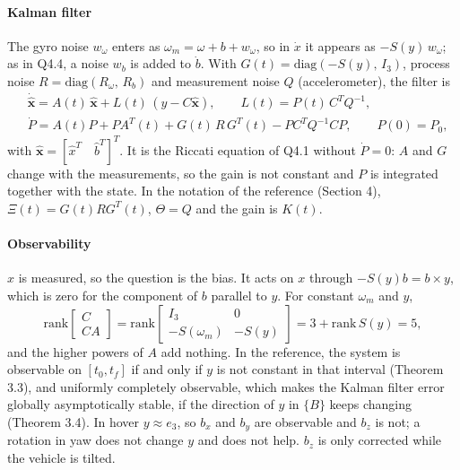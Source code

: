 \documentclass[10pt,a4paper]{article}
\newenvironment{answer}{%
  \begin{tcolorbox}[breakable,enhanced,colback=white,colframe=greyline,
    boxrule=0.6pt,arc=2pt,left=8pt,right=8pt,top=7pt,bottom=7pt,
    before skip=0pt,after skip=12pt]
}{\end{tcolorbox}}
\newcommand{\fB}{\{B\}}
\begin{document}
\begin{answer}
\paragraph{Kalman filter}
The gyro noise $w_\omega$ enters as $\omega_m = \omega + b + w_\omega$,
so in $\dot x$ it appears as $-S(y)\,w_\omega$; as in Q4.4, a noise
$w_b$ is added to $\dot b$. With $G(t) = \mathrm{diag}(-S(y),\, I_3)$,
process noise $R = \mathrm{diag}(R_\omega,\, R_b)$ and measurement noise
$Q$ (accelerometer), the filter is
\[
\begin{aligned}
  &\dot{\hat{\mathbf{x}}} = A(t)\,\hat{\mathbf{x}} + L(t)\,(y - C\hat{\mathbf{x}}),
  \qquad L(t) = P(t)\,C^TQ^{-1},\\
  &\dot P = A(t)P + PA^T(t) + G(t)\,R\,G^T(t) - PC^TQ^{-1}CP, \qquad P(0)=P_0 ,
\end{aligned}
\]
with $\hat{\mathbf{x}} = [\hat x^T \quad \hat b^T]^T$. It is the
Riccati equation of Q4.1 without $\dot P = 0$: $A$ and $G$ change with
the measurements, so the gain is not constant and $P$ is integrated
together with the state. In the notation of the reference (Section 4),
$\Xi(t) = G(t)RG^T(t)$, $\Theta = Q$ and the gain is $K(t)$.

\paragraph{Observability}
$x$ is measured, so the question is the bias. It acts on $x$ through
$-S(y)b = b\times y$, which is zero for the component of $b$ parallel to
$y$. For constant $\omega_m$ and $y$,
\[
  \mathrm{rank}\begin{bmatrix} C\\ CA \end{bmatrix}
  = \mathrm{rank}\begin{bmatrix} I_3 & 0\\ -S(\omega_m) & -S(y) \end{bmatrix}
  = 3 + \mathrm{rank}\,S(y) = 5 ,
\]
and the higher powers of $A$ add nothing. In the reference, the system
is observable on $[t_0,t_f]$ if and only if $y$ is not constant in that
interval (Theorem 3.3), and uniformly completely observable, which makes
the Kalman filter error globally asymptotically stable, if the direction
of $y$ in $\fB$ keeps changing (Theorem 3.4). In hover $y\approx e_3$, so $b_x$ and $b_y$ are
observable and $b_z$ is not; a rotation in yaw does not change $y$ and
does not help. $b_z$ is only corrected while the vehicle is tilted.


\end{answer}
\end{document}
